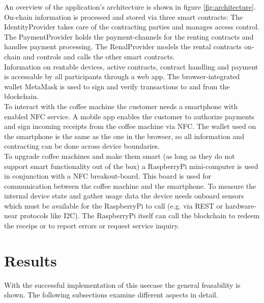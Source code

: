\documentclass[conference]{IEEEtran}
\begin{document}
An overview of the application's architecture is shown in figure \ref{fig:architecture}. On-chain information is processed and stored via three smart contracts: The IdentityProvider takes care of the contracting parties and manages access control. The PaymentProvider holds the payment-channels for the renting contracts and handles payment processing. The RenalProvider models the rental contracts on-chain and controls and calls the other smart contracts.\\
Information on rentable devices, active contracts, contract handling and payment is accessable by all participants through a web app. The browser-integrated wallet MetaMask is used to sign and verify transactions to and from the blockchain.\\
To interact with the coffee machine the customer needs a smartphone with enabled NFC service. A mobile app enables the customer to authorize payments and sign incoming receipts from the coffee machine via NFC. The wallet used on the smartphone is the same as the one in the browser, so all information and contracting can be done across device boundaries.\\
To upgrade coffee machines and make them smart (as long as they do not support smart functionality out of the box) a RaspberryPi mini-computer is used in conjunction with a NFC breakout-board. This board is used for communication between the coffee machine and the smartphone. To measure the internal device state and gather usage data the device needs onboard sensors which must be available for the RaspberryPi to call (e.g. via REST or hardware-near protocols like I2C). The RaspberryPi itself can call the blockchain to redeem the receips or to report errors or request service inquiry.\\


\section{Results}
With the successful implementation of this usecase the general feasability is shown. The following subsections examine different aspects in detail.
\end{document}
